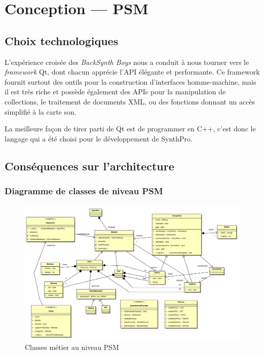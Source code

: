 \section{Conception — PSM}

\subsection{Choix technologiques}

L'expérience croisée des \emph{BackSynth Boys} nous a conduit à
nous tourner vers le \emph{framework} Qt, dont chacun apprécie
l'API élégante et performante. Ce framework fournit surtout des
outils pour la construction d'interfaces homme-machine, mais il est
très riche et possède également des APIs pour la manipulation de
collections, le traitement de documents XML, ou des fonctions
donnant un accès simplifié à la carte son.

La meilleure façon de tirer parti de Qt est de programmer en C++,
c'est donc le langage qui a été choisi pour le développement de
SynthPro.

\subsection{Conséquences sur l'architecture}

\subsubsection{Diagramme de classes de niveau PSM}

\begin{figure}[htb]
\centering
\includegraphics[width=21cm,angle=90]{../img/ps/business-psm.pdf}
\caption{Classes métier au niveau PSM}
\label{psm-class}
\end{figure}


